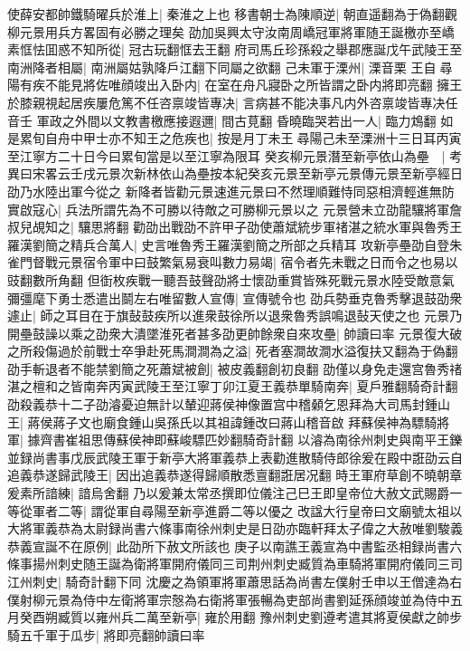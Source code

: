 使薛安都帥鐵騎曜兵於淮上|{
	秦淮之上也}
移書朝士為陳順逆|{
	朝直遥翻為于偽翻觀柳元景用兵方畧固有必勝之理矣}
劭加吳興太守汝南周嶠冠軍將軍随王誕檄亦至嶠素恇怯囬惑不知所從|{
	冠古玩翻恇去王翻}
府司馬丘珍孫殺之舉郡應誕戊午武陵王至南洲降者相屬|{
	南洲屬姑孰降戶江翻下同屬之欲翻}
己未軍于溧州|{
	溧音栗}
王自尋陽有疾不能見將佐唯顔竣出入卧内|{
	在室在舟凡寢卧之所皆謂之卧内將即亮翻}
擁王於膝親視起居疾屢危篤不任咨禀竣皆專决|{
	言病甚不能决事凡内外咨禀竣皆專决任音壬}
軍政之外間以文教書檄應接遐邇|{
	間古莧翻}
昏曉臨哭若出一人|{
	臨力鴆翻}
如是累旬自舟中甲士亦不知王之危疾也|{
	按是月丁未王尋陽己未至溧洲十三日耳丙寅至江寧方二十日今曰累旬當是以至江寧為限耳}
癸亥柳元景潛至新亭依山為壘　|{
	考異曰宋畧云壬戌元景次新林依山為壘按本紀癸亥元景至新亭元景傳元景至新亭經日劭乃水陸出軍今從之}
新降者皆勸元景速進元景曰不然理順難恃同惡相濟輕進無防實啟寇心|{
	兵法所謂先為不可勝以待敵之可勝柳元景以之}
元景營未立劭龍驤將軍詹叔兒覘知之|{
	驤思將翻}
勸劭出戰劭不許甲子劭使蕭斌統步軍禇湛之統水軍與魯秀王羅漢劉簡之精兵合萬人|{
	史言唯魯秀王羅漢劉簡之所部之兵精耳}
攻新亭壘劭自登朱雀門督戰元景宿令軍中曰鼓繁氣易衰叫數力易竭|{
	宿令者先未戰之日而令之也易以豉翻數所角翻}
但衘枚疾戰一聽吾鼓聲劭將士懷劭重賞皆殊死戰元景水陸受敵意氣彌彊麾下勇士悉遣出鬬左右唯留數人宣傳|{
	宣傳號令也}
劭兵勢垂克魯秀擊退鼓劭衆遽止|{
	師之耳目在于旗鼔鼓疾所以進衆鼓徐所以退衆魯秀誤鳴退鼔天使之也}
元景乃開壘鼓譟以乘之劭衆大潰墜淮死者甚多劭更帥餘衆自來攻壘|{
	帥讀曰率}
元景復大破之所殺傷過於前戰士卒爭赴死馬澗澗為之溢|{
	死者塞澗故澗水溢復扶又翻為于偽翻}
劭手斬退者不能禁劉簡之死蕭斌被創|{
	被皮義翻創初良翻}
劭僅以身免走還宫魯秀禇湛之檀和之皆南奔丙寅武陵王至江寧丁卯江夏王義恭單騎南奔|{
	夏戶雅翻騎奇計翻}
劭殺義恭十二子劭濬憂迫無計以輦迎蔣侯神像置宫中稽顙乞恩拜為大司馬封鍾山王|{
	蔣侯蔣子文也廟食鍾山吳孫氏以其祖諱鍾改曰蔣山稽音啟}
拜蘇侯神為驃騎將軍|{
	據齊書崔祖思傳蘇侯神即蘇峻驃匹妙翻騎奇計翻}
以濬為南徐州刺史與南平王鑠並録尚書事戊辰武陵王軍于新亭大將軍義恭上表勸進散騎侍郎徐爰在殿中誑劭云自追義恭遂歸武陵王|{
	因出追義恭遂得歸順散悉亶翻誑居况翻}
時王軍府草創不曉朝章爰素所諳練|{
	諳烏舍翻}
乃以爰兼太常丞撰即位儀注己巳王即皇帝位大赦文武賜爵一等從軍者二等|{
	謂從軍自尋陽至新亭進爵二等以優之}
改諡大行皇帝曰文廟號太祖以大將軍義恭為太尉録尚書六條事南徐州刺史是日劭亦臨軒拜太子偉之大赦唯劉駿義恭義宣誕不在原例|{
	此劭所下赦文所該也}
庚子以南譙王義宣為中書監丞相録尚書六條事揚州刺史随王誕為衛將軍開府儀同三司荆州刺史臧質為車騎將軍開府儀同三司江州刺史|{
	騎奇計翻下同}
沈慶之為領軍將軍蕭思話為尚書左僕射壬申以王僧達為右僕射柳元景為侍中左衛將軍宗慤為右衛將軍張暢為吏部尚書劉延孫顔竣並為侍中五月癸酉朔臧質以雍州兵二萬至新亭|{
	雍於用翻}
豫州刺史劉遵考遣其將夏侯獻之帥步騎五千軍于瓜步|{
	將即亮翻帥讀曰率}
